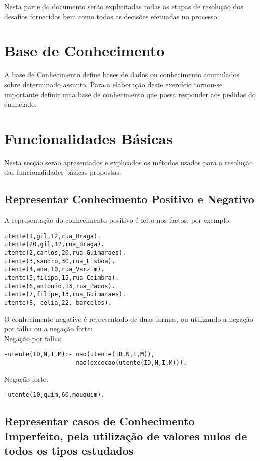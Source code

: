 Nesta parte do documento serão explicitadas todas as etapas de resolução dos desafios fornecidos bem como todas as decisões efetuadas no processo.


\section{Base de Conhecimento}
\label{p3:baseConhe}

A base de Conhecimento define bases de dados ou conhecimento acumulados sobre determinado assunto.
Para a elaboração deste exercício tornou-se importante definir uma base de conhecimento que possa responder aos pedidos do enunciado.

\section{Funcionalidades Básicas}
\label{p3:funcbasic}
Nesta secção serão apresentados e explicados os métodos usados para a resolução das funcionalidades básicas propostas.

\subsection{Representar Conhecimento Positivo e Negativo}

A representação do conhecimento positivo é feito nos factos, por exemplo:

\begin{verbatim}
utente(1,gil,12,rua_Braga).
utente(20,gil,12,rua_Braga).
utente(2,carlos,20,rua_Guimaraes).
utente(3,sandro,30,rua_Lisboa).
utente(4,ana,10,rua_Varzim).
utente(5,filipa,15,rua_Coimbra).
utente(6,antonio,13,rua_Pacos).
utente(7,filipe,13,rua_Guimaraes).
utente(8, celia,22, barcelos). 
\end{verbatim}

O conhecimento negativo é representado de duas formas, ou utilizando a negação por falha ou a negação forte: \\


Negação por falha: 
\begin{verbatim}
-utente(ID,N,I,M):- nao(utente(ID,N,I,M)),
					nao(excecao(utente(ID,N,I,M))).
\end{verbatim}

Negação forte: 
\begin{verbatim}
-utente(10,quim,60,mouquim). 
\end{verbatim}



\subsection{Representar casos de Conhecimento Imperfeito, pela utilização de valores nulos de todos os tipos estudados}

